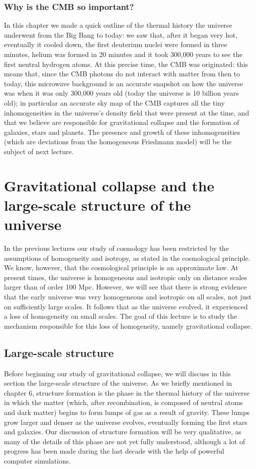 \documentclass[11pt, a4paper,oneside,openright]{book}
\numberwithin{equation}{section}
\begin{document}
\subsection{Why is the CMB so important?}
In this chapter we made a quick outline of the thermal history the universe underwent from the Big Bang to today: we saw that, after it began very hot, eventually it cooled down, the first deuterium nuclei were formed in three minutes, helium was formed in 20 minutes and it took 300,000 years to see the first neutral hydrogen atoms. At this precise time, the CMB was originated: this means that, since the CMB photons do not interact with matter from then to today, this microwave background is an accurate snapshot on how the universe was when it was only 300,000 years old (today the universe is 10 billion years old); in particular an accurate sky map of the CMB captures all the tiny inhomogeneities in the universe's density field that were present at the time, and that we believe are responsible for gravitational collapse and the formation of galaxies, stars and planets. The presence and growth of these inhomogeneities (which are deviations from the homogeneous Friedmann model) will be the subject of next 
lecture.


\chapter{Gravitational collapse and the large-scale structure of the universe}

In the previous lectures our study of cosmology has been restricted by the assumptions of homogeneity and isotropy, as stated in the cosmological principle. We know, however, that the cosmological principle is an approximate law. At present times, the universe is homogeneous and isotropic only on distance scales larger than of order 100 Mpc. However, we will see that there is strong evidence that the early universe was very homogeneous and isotropic on all scales, not just on sufficiently large scales. It follows that as the universe evolved, it experienced a loss of homogeneity on small scales. The goal of this lecture is to study the mechanism responsible for this loss of homogeneity, namely gravitational collapse.

\section{Large-scale structure}

Before beginning our study of gravitational collapse, we will discuss in this section the large-scale structure of the universe. As we briefly mentioned in chapter 6, structure formation is the phase in the thermal history of the universe in which the matter (which, after recombination, is composed of neutral atoms and dark matter) begins to form lumps of gas as a result of gravity. These lumps grow larger and denser as the universe evolves, eventually forming the first stars and galaxies. Our discussion of structure formation will be very qualitative, as many of the details of this phase are not yet fully understood, although a lot of progress has been made during the last decade with the help of powerful computer simulations.
\end{document}
